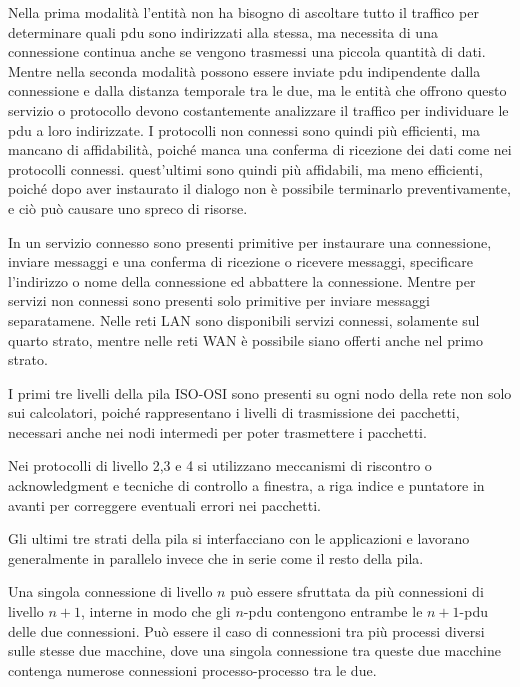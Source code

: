 \documentclass{article}
\numberwithin{equation}{subsection}
\begin{document}
Nella prima modalità l'entità non ha bisogno di ascoltare tutto il traffico per determinare quali pdu sono indirizzati alla stessa, ma necessita di una connessione 
continua anche se vengono trasmessi una piccola quantità di dati. Mentre nella seconda modalità possono essere inviate pdu indipendente dalla connessione e dalla 
distanza temporale tra le due, ma le entità che offrono questo servizio o protocollo devono costantemente analizzare il traffico per individuare le pdu a loro 
indirizzate. 
I protocolli non connessi sono quindi più efficienti, ma mancano di affidabilità, poiché manca una conferma di ricezione dei dati come nei protocolli connessi. quest'ultimi 
sono quindi più affidabili, ma meno efficienti, poiché dopo aver instaurato il dialogo non è possibile terminarlo preventivamente, e ciò può causare uno spreco di risorse. 


In un servizio connesso sono presenti primitive per instaurare una connessione, inviare messaggi e una conferma di ricezione o ricevere messaggi, specificare 
l'indirizzo o nome della connessione ed abbattere la connessione. Mentre per servizi non connessi sono presenti solo primitive per inviare messaggi separatamene. 
Nelle reti LAN sono disponibili servizi connessi, solamente sul quarto strato, mentre nelle reti WAN è possibile siano offerti anche nel primo strato.  



I primi tre livelli della pila ISO-OSI sono presenti su ogni nodo della rete non solo sui calcolatori, poiché rappresentano i livelli di trasmissione dei pacchetti, 
necessari anche nei nodi intermedi per poter trasmettere i pacchetti. 

Nei protocolli di livello 2,3 e 4 si utilizzano meccanismi di riscontro o acknowledgment e tecniche di controllo a finestra, a riga indice e puntatore in avanti per 
correggere eventuali errori nei pacchetti. 

Gli ultimi tre strati della pila si interfacciano con le applicazioni e lavorano generalmente in parallelo invece che in serie come il resto della pila. 

Una singola connessione di livello $n$ può essere sfruttata da più connessioni di livello $n+1$, interne in modo che gli $n$-pdu contengono entrambe le $n+1$-pdu delle due 
connessioni. Può essere il caso di connessioni tra più processi diversi sulle stesse due macchine, dove una singola connessione tra queste due macchine contenga numerose 
connessioni processo-processo tra le due. 
\end{document}
